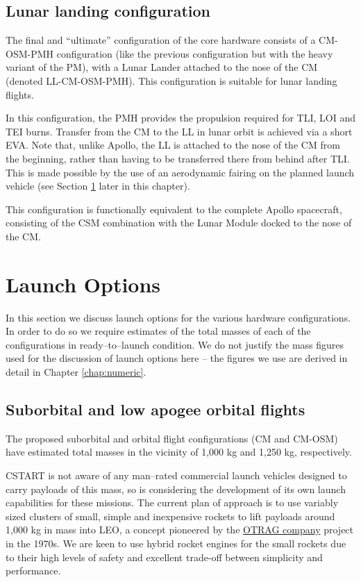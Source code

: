 \documentclass{report}
\begin{document}
\subsection{Lunar landing configuration}

The final and ``ultimate'' configuration of the core hardware consists of a CM-OSM-PMH configuration (like the previous configuration but with the heavy variant of the PM), with a Lunar Lander attached to the nose of the CM (denoted LL-CM-OSM-PMH).  This configuration is suitable for lunar landing flights.

In this configuration, the PMH provides the propulsion required for TLI, LOI and TEI burns.  Transfer from the CM to the LL in lunar orbit is achieved via a short EVA.  Note that, unlike Apollo, the LL is attached to the nose of the CM from the beginning, rather than having to be transferred there from behind after TLI.  This is made possible by the use of an aerodynamic fairing on the planned launch vehicle (see Section \ref{sec:launchopt} later in this chapter).

This configuration is functionally equivalent to the complete Apollo spacecraft, consisting of the CSM combination with the Lunar Module docked to the nose of the CM.

\section{Launch Options} \label{sec:launchopt}

In this section we discuss launch options for the various hardware configurations.  In order to do so we require estimates of the total masses of each of the configurations in ready--to--launch condition.  We do not justify the mass figures used for the discussion of launch options here -- the figures we use are derived in detail in Chapter \ref{chap:numeric}.

\subsection{Suborbital and low apogee orbital flights}

The proposed suborbital and orbital flight configurations (CM and CM-OSM) have estimated total masses in the vicinity of 1,000 kg and 1,250 kg, respectively.

CSTART is not aware of any man--rated commercial launch vehicles designed to carry payloads of this mass, so is considering the development of its own launch capabilities for these missions.  The current plan of approach is to use variably sized clusters of small, simple and inexpensive rockets to lift payloads around 1,000 kg in mass into LEO, a concept pioneered by the \href{http://en.wikipedia.org/wiki/OTRAG}{OTRAG company} project in the 1970s.  We are keen to use hybrid rocket engines for the small rockets due to their high levels of safety and excellent trade-off between simplicity and performance.
\end{document}

